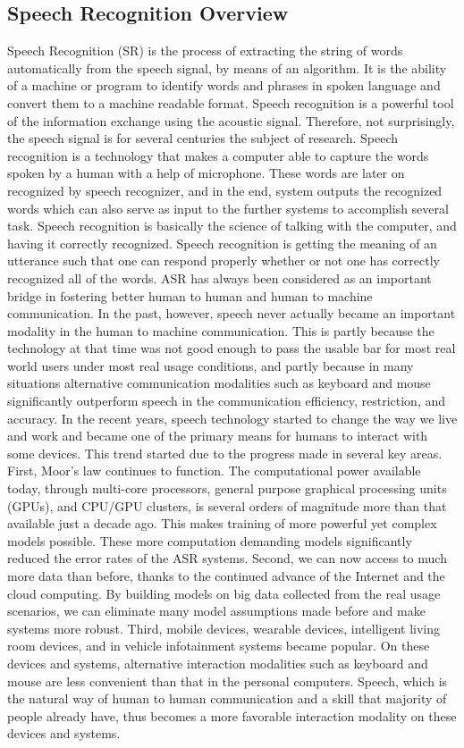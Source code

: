\subsection{Speech Recognition Overview}
Speech Recognition (SR) is the process of extracting the string of words automatically from the speech signal, by means of an algorithm. It is the ability of a machine or program to identify words and phrases in spoken language and convert them to a machine readable format. Speech recognition is a powerful tool of the information exchange using the acoustic signal. Therefore, not surprisingly, the speech signal is for several centuries the subject of research. Speech recognition is a technology that makes a computer able to capture the words spoken by a human with a help of microphone. These words are later on recognized by speech recognizer, and in the end, system outputs the recognized words which can also serve as input to the further systems to accomplish several task. Speech recognition is basically the science of talking with the computer, and having it correctly recognized. Speech recognition is getting the meaning of an utterance such that one can respond properly whether or not one has correctly recognized all of the words. ASR has always been considered as an important bridge in fostering better human to human and human to machine communication. In the past, however, speech never actually became an important modality in the human to machine communication. This is partly because the technology at that time was not good enough to pass the usable bar for most real world users under most real usage conditions, and partly because in many situations alternative communication modalities such as keyboard and mouse significantly outperform speech in the communication efficiency, restriction, and accuracy. In the recent years, speech technology started to change the way we live and work and became one of the primary means for humans to interact with some devices. This trend started due to the progress made in several key areas. First, Moor's law continues to function. The computational power available today, through multi-core processors, general purpose graphical processing units (GPUs), and CPU/GPU clusters, is several orders of magnitude more than that available just a decade ago. This makes training of more powerful yet complex models possible. These more computation demanding models significantly reduced the error rates of the ASR systems. Second, we can now access to much more data than before, thanks to the continued advance of the Internet and the cloud computing. By building models on big data collected from the real usage scenarios, we can eliminate many model assumptions made before and make systems more robust. Third, mobile devices, wearable devices, intelligent living room devices, and in vehicle infotainment systems became popular. On these devices and systems, alternative interaction modalities such as keyboard and mouse are less convenient than that in the personal computers. Speech, which is the natural way of human to human communication and a skill that majority of people already have, thus becomes a more favorable interaction modality on these devices and systems.



